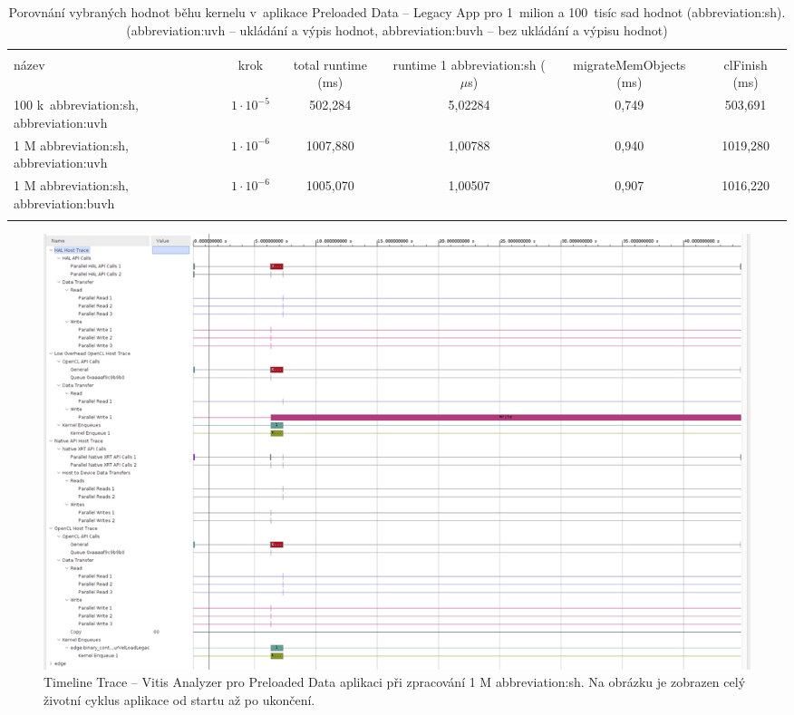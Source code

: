 \documentclass[a4paper, twoside, 11pt]{article}
\begin{document}
		\begin{table}[H]
		\centering
		\caption{Porovnání vybraných hodnot běhu kernelu v~aplikace Preloaded Data – Legacy App pro 1~milion a 100~tisíc sad hodnot (\gls{abbreviation:sh}). (\gls{abbreviation:uvh} – ukládání a výpis hodnot, \gls{abbreviation:buvh} – bez ukládání a výpisu hodnot)}
		\vspace*{0.15cm}
		\resizebox{\textwidth}{!}
		{
		\begin{tabular}{!{\vrule width 2pt} l | c | c | c | c | c !{\vrule width 2pt}}
		\\
		název & krok & total runtime (ms) & runtime 1 \gls{abbreviation:sh} ($\mu$s) & migrateMemObjects (ms) & clFinish (ms)\\
		100 k~\gls{abbreviation:sh}, \gls{abbreviation:uvh} & $1\cdot 10^{-5}$ & 502,284 & 5,02284 & 0,749 & 503,691\\  M \gls{abbreviation:sh}, \gls{abbreviation:uvh} & $1\cdot 10^{-6}$ & 1007,880 & 1,00788 & 0,940 & 1019,280 \\  M \gls{abbreviation:sh}, \gls{abbreviation:buvh} & $1\cdot 10^{-6}$ & 1005,070 & 1,00507 & 0,907 & 1016,220\\
			\end{tabular}
		}
			\label{tab:porovnani-vybranych-hodnot-behu-kernelu-pro-1M-100k-sad-hodnot}
	\end{table}

	\begin{figure}[htbp!]
		\centering
		\includegraphics[width=1\textwidth]{src/png/vitis-analyzer/legacy-rt/1M-data/writing-data-output/legacy-rt-step-0.000001-timeline-trace-zoom-out.png}
		\caption{Timeline Trace – Vitis Analyzer pro Preloaded Data aplikaci při zpracování 1 M \gls{abbreviation:sh}. Na obrázku je zobrazen celý životní cyklus aplikace od startu až po ukončení.}
		\label{fig:legacy-rt-step-0.000001-timeline-trace-zoom-out}
	\end{figure}
\end{document}
